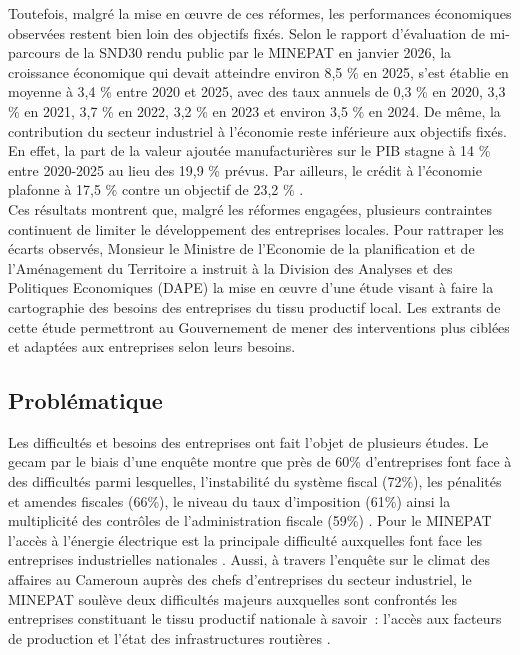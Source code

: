 \documentclass[12pt, a4paper, oneside]{report}
\begin{document}
	Toutefois, malgré la mise en œuvre de ces réformes, les performances économiques observées restent bien loin  des objectifs fixés. Selon le rapport d’évaluation de mi-parcours de la SND30 rendu public par le MINEPAT en janvier 2026, la croissance économique qui devait atteindre environ 8,5 \% en 2025, s’est établie en moyenne à 3,4 \% entre 2020 et 2025, avec des taux annuels de 0,3 \% en 2020, 3,3 \% en 2021, 3,7 \% en 2022, 3,2 \% en 2023 et environ 3,5 \% en 2024. De même, la contribution du secteur industriel à l’économie reste inférieure aux objectifs fixés. En effet, la part de la valeur ajoutée manufacturières sur le PIB stagne à 14 \% entre 2020-2025 au lieu des 19,9 \% prévus. Par ailleurs, le crédit à l’économie plafonne à 17,5 \% contre un objectif de 23,2 \% \cite{minepat2025}. \\
	
	Ces résultats montrent que, malgré les réformes engagées, plusieurs contraintes continuent de limiter le développement des entreprises locales. Pour rattraper les écarts observés, Monsieur le Ministre de l’Economie de la planification et de l’Aménagement du Territoire a instruit à la Division des Analyses et des Politiques Economiques (DAPE) la mise en œuvre d’une étude visant à faire la cartographie des besoins des entreprises du tissu productif local. Les extrants de cette étude permettront au Gouvernement de mener des interventions plus ciblées et adaptées aux entreprises selon leurs besoins.
	
	
	\subsection{Problématique}
	
	Les difficultés et besoins des entreprises ont fait l’objet de plusieurs études. Le \gls{gecam} par le biais d’une enquête montre que près de 60\% d’entreprises font face à des difficultés parmi lesquelles, l’instabilité du système fiscal (72\%), les pénalités et amendes fiscales (66\%), le niveau du taux d’imposition (61\%) ainsi la multiplicité des contrôles de l’administration fiscale (59\%) \cite{gecam2019}. Pour le MINEPAT  l’accès à l’énergie électrique est la principale difficulté auxquelles font face les entreprises industrielles nationales \cite{minepat2022}. Aussi, à travers l’enquête sur le climat des affaires au Cameroun auprès des chefs d’entreprises du secteur industriel, le MINEPAT  soulève deux difficultés majeurs auxquelles sont confrontés les entreprises constituant le tissu productif nationale à savoir : l’accès aux facteurs de production et l’état des infrastructures routières \cite{minepat2023}. \\
	
\end{document}
